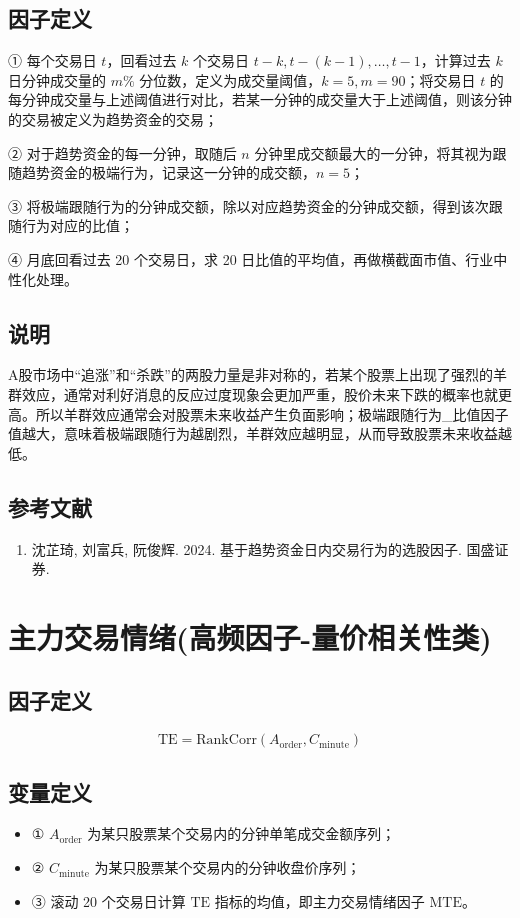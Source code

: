 \documentclass{article}
\begin{document}
\subsection{因子定义}
① 每个交易日 \( t \)，回看过去 \( k \) 个交易日 \( t-k, t-(k-1), \ldots, t-1 \)，计算过去 \( k \) 日分钟成交量的 \( m\% \) 分位数，定义为成交量阈值，\( k=5, m=90 \)；将交易日 \( t \) 的每分钟成交量与上述阈值进行对比，若某一分钟的成交量大于上述阈值，则该分钟的交易被定义为趋势资金的交易；

② 对于趋势资金的每一分钟，取随后 \( n \) 分钟里成交额最大的一分钟，将其视为跟随趋势资金的极端行为，记录这一分钟的成交额，\( n=5 \)；

③ 将极端跟随行为的分钟成交额，除以对应趋势资金的分钟成交额，得到该次跟随行为对应的比值；

④ 月底回看过去 20 个交易日，求 20 日比值的平均值，再做横截面市值、行业中性化处理。

\subsection{说明}
A股市场中“追涨”和“杀跌”的两股力量是非对称的，若某个股票上出现了强烈的羊群效应，通常对利好消息的反应过度现象会更加严重，股价未来下跌的概率也就更高。所以羊群效应通常会对股票未来收益产生负面影响；极端跟随行为\_比值因子值越大，意味着极端跟随行为越剧烈，羊群效应越明显，从而导致股票未来收益越低。

\subsection{参考文献}
\begin{enumerate}
    \item 沈芷琦, 刘富兵, 阮俊辉. 2024. 基于趋势资金日内交易行为的选股因子. 国盛证券.
\end{enumerate}

\section{主力交易情绪(高频因子-量价相关性类)}

\subsection{因子定义}
\begin{equation}
    \mathrm{TE} = \mathrm{RankCorr}(A_{\mathrm{order}}, C_{\mathrm{minute}})
\end{equation}

\subsection{变量定义}
\begin{itemize}
    \item ① \( A_{\mathrm{order}} \) 为某只股票某个交易内的分钟单笔成交金额序列；
    \item ② \( C_{\mathrm{minute}} \) 为某只股票某个交易内的分钟收盘价序列；
    \item ③ 滚动 20 个交易日计算 \( \mathrm{TE} \) 指标的均值，即主力交易情绪因子 \( \mathrm{MTE} \)。
\end{itemize}
\end{document}
